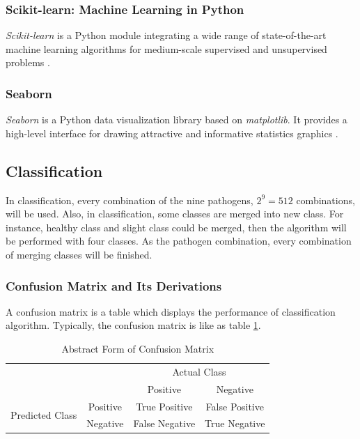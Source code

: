 \documentclass[aps, 11pt, a4paper]{article}
\begin{document}
    		\subsubsection{Scikit-learn: Machine Learning in Python}
    			\textit{Scikit-learn} is a Python module integrating a wide range of state-of-the-art machine learning algorithms for medium-scale supervised and unsupervised problems \cite{ref:sklearn1}.
    			    			
    		\subsubsection{Seaborn}
		   		\textit{Seaborn} is a Python data visualization library based on \textit{matplotlib}. It provides a high-level interface for drawing attractive and informative statistics graphics \cite{ref:seaborn1}.
		
			\subsection{Classification}
				In classification, every combination of the nine pathogens, $2^9 = 512$ combinations, will be used. Also, in classification, some classes are merged into new class. For instance, healthy class and slight class could be merged, then the algorithm will be performed with four classes. As the pathogen combination, every combination of merging classes will be finished. 
				
				\subsubsection{Confusion Matrix and Its Derivations}
					A confusion matrix is a table which displays the performance of classification algorithm. Typically, the confusion matrix is like as table \ref{tb:confusion}.
					
					\begin{table}[htbp]
						\centering
						\caption{Abstract Form of Confusion Matrix}
						\label{tb:confusion}
						\begin{tabular}{cc|cc}
							\multicolumn{2}{c}{\multirow{2}{*}{}} & \multicolumn{2}{|c}{Actual Class} \\ \cline{3-4} 
							\multicolumn{2}{c|}{} & Positive & Negative \\ \hline
							\multicolumn{1}{c|}{\multirow{2}{*}{Predicted Class}} & Positive & True Positive & False Positive \\
							\multicolumn{1}{c|}{} & Negative & False Negative & True Negative
						\end{tabular}
					\end{table}
					
\end{document}
